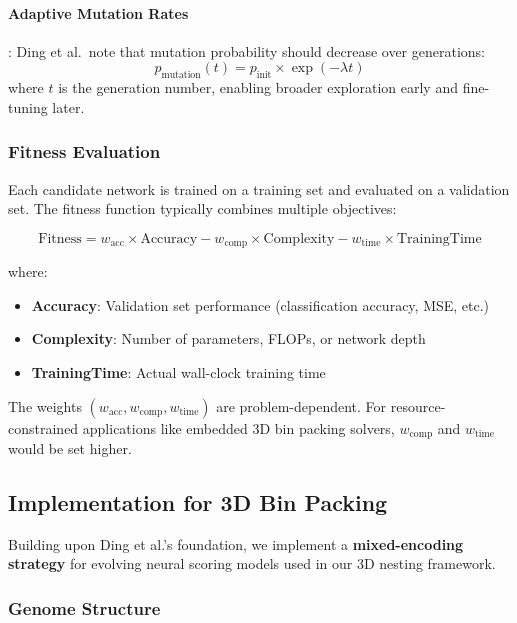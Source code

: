 \paragraph{Adaptive Mutation Rates}:
Ding et al.\ note that mutation probability should decrease over generations:
\begin{equation}
p_{\text{mutation}}(t) = p_{\text{init}} \times \exp(-\lambda t)
\end{equation}
where $t$ is the generation number, enabling broader exploration early and fine-tuning later.

\subsubsection{Fitness Evaluation}

Each candidate network is trained on a training set and evaluated on a validation set. The fitness function typically combines multiple objectives:

\begin{equation}
\text{Fitness} = w_{\text{acc}} \times \text{Accuracy} - w_{\text{comp}} \times \text{Complexity} - w_{\text{time}} \times \text{TrainingTime}
\end{equation}

where:
\begin{itemize}
    \item \textbf{Accuracy}: Validation set performance (classification accuracy, MSE, etc.)
    \item \textbf{Complexity}: Number of parameters, FLOPs, or network depth
    \item \textbf{TrainingTime}: Actual wall-clock training time
\end{itemize}

The weights $(w_{\text{acc}}, w_{\text{comp}}, w_{\text{time}})$ are problem-dependent. For resource-constrained applications like embedded 3D bin packing solvers, $w_{\text{comp}}$ and $w_{\text{time}}$ would be set higher.

\subsection{Implementation for 3D Bin Packing}
\label{subsec:implementation}

Building upon Ding et al.'s foundation, we implement a \textbf{mixed-encoding strategy} for evolving neural scoring models used in our 3D nesting framework.

\subsubsection{Genome Structure}

